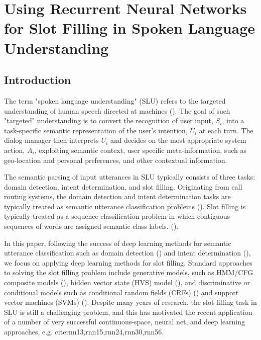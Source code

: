 \chapter{Using Recurrent Neural Networks for Slot Filling in Spoken Language Understanding \label{chap:rnn}}

\section{Introduction}

The term "spoken language understanding" (SLU) refers to the targeted
understanding of human speech directed at machines (\cite{rnn1}). The goal of such
"targeted" understanding is to convert the recognition of user input, $S_i$, into
a task-specific semantic representation of the user's intention, $U_i$ at each
turn. The dialog manager then interprets $U_i$ and decides on the most
appropriate system action, $A_i$, exploiting semantic context, user specific
meta-information, such as geo-location and personal preferences, and other
contextual information.

The semantic parsing of input utterances in SLU typically consists of three
tasks: domain detection, intent determination, and slot filling. Originating
from call routing systems, the domain detection and intent determination tasks
are typically treated as semantic utterance classification problems (\cite{rnn2,rnn3,rnn4,rnn30}).
Slot filling is typically treated as a sequence classification problem in which
contiguous sequences of words are assigned semantic class labels.
(\cite{rnn5,rnn7,rnn31,rnn32,rnn33,rnn34,rnn40,rnn55}). 

In this paper, following the success of deep learning methods for semantic
utterance classification such as domain detection (\cite{rnn30}) and intent determination
(\cite{rnn13,rnn39,rnn50}), we focus on applying deep learning methods for slot filling.
Standard approaches to solving the slot filling problem include generative
models, such as HMM/CFG composite models (\cite{rnn31,rnn5,rnn53}), hidden vector state (HVS)
model (\cite{rnn33}), and discriminative or conditional models such as conditional random
fields (CRFs) (\cite{rnn6, rnn7, rnn32, rnn34, rnn40, rnn51, rnn54}) and support vector machines (SVMs) (\cite{rnn52}).
Despite many years of research, the slot filling task in SLU is still a
challenging problem, and this has motivated the recent application of a number
of very successful continuous-space, neural net, and deep learning approaches,
e.g. cite{rnn13,rnn15,rnn24,rnn30,rnn56}. 

